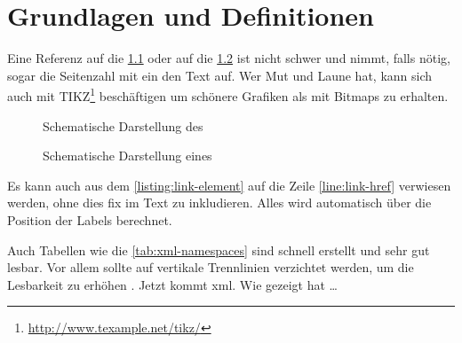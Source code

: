 
\chapter{Grundlagen und Definitionen}
\label{chap:Grundlagen}
\blindtext

Eine Referenz auf die \cref{fig:wot} oder auf die \cref{fig:ht} ist nicht schwer und nimmt, falls nötig, sogar die Seitenzahl mit ein den Text auf. Wer Mut und
Laune hat, kann sich auch mit TIKZ\footnote{\url{http://www.texample.net/tikz/}} beschäftigen um schönere Grafiken als mit Bitmaps zu erhalten.

\begin{figure}
\centering

\caption{Schematische Darstellung des }
\label{fig:wot}
\end{figure}


\begin{figure}
\centering
\begin{sideways}

\end{sideways}
\caption{Schematische Darstellung eines }
\label{fig:ht}
\end{figure}

Es kann auch aus dem \cref{listing:link-element} auf die Zeile \ref{line:link-href} verwiesen werden, ohne dies fix im Text zu inkludieren. Alles wird automatisch über die
Position der Labels berechnet.



Auch Tabellen wie die \cref{tab:xml-namespaces} sind schnell erstellt und sehr gut lesbar. Vor allem sollte auf vertikale Trennlinien verzichtet werden, um die
Lesbarkeit zu erhöhen \cite{latex}. Jetzt kommt \gls{xml}. Wie  gezeigt hat \ldots

